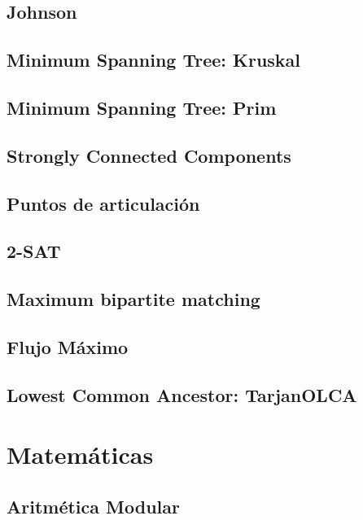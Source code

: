 \documentclass[10pt,letterpaper,twocolumn,twosided]{article}
\begin{document}
\subsection{Johnson}

\subsection{Minimum Spanning Tree: Kruskal}

\subsection{Minimum Spanning Tree: Prim}

\subsection{Strongly Connected Components}

\subsection{Puntos de articulación}

\subsection{2-SAT}

\subsection{Maximum bipartite matching}

\subsection{Flujo Máximo}

\subsection{Lowest Common Ancestor: TarjanOLCA}

\section{Matemáticas}

\subsection{Aritmética Modular}
\end{document}
